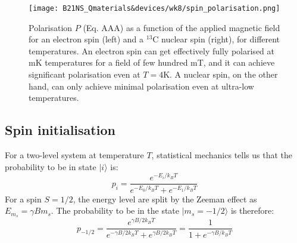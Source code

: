 \documentclass[a4paper,11pt]{article}
\newcommand{\ket}[1]{| #1 \rangle}
\begin{document}
\begin{figure}[h]
\centering
\texttt{[image: B21NS\_Qmaterials\&devices/wk8/spin\_polarisation.png]}
\caption{Polarisation $P$ (Eq. AAA) as a function of the applied magnetic field for an electron spin (left) and a $^{13}$C nuclear spin (right), for different temperatures. An electron spin can get effectively fully polarised at mK temperatures for a field of few hundred mT, and it can achieve significant polarisation even at $T=4$K. A nuclear spin, on the other hand, can only achieve minimal polarisation even at ultra-low temperatures.}
\label{fig:spin_polar}
\end{figure}

\subsection {Spin initialisation}
For a two-level system at temperature $T$, statistical mechanics tells us that the probability to be in state $\ket{i}$ is:
\begin{equation}
    p_i = \frac{e^{-E_i/k_BT}}{e^{-E_0/k_BT} + e^{-E_1/k_BT}}
\end{equation}
For a spin $S=1/2$, the energy level are split by the Zeeman effect as $E_{m_s} = \gamma B m_s$. The probability to be in the state $\ket{m_s=-1/2}$ is therefore:
\begin{equation}
    p_{-1/2} = \frac{e^{\gamma B/2 k_BT}}{e^{-\gamma B/2k_BT} + e^{\gamma B/2 k_B T}} = \frac{1}{1 + e^{-\gamma B/k_B T}}
\end{equation}
\end{document}
